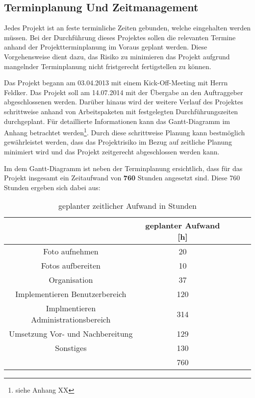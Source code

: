 \subsection{Terminplanung Und Zeitmanagement}
\label{sec:TerminplanungUndZeitManagement}

Jedes Projekt ist an feste terminliche Zeiten gebunden, welche eingehalten werden müssen. Bei der Durchführung dieses 
Projektes sollen die relevanten Termine anhand der Projektterminplanung im Voraus geplant werden. Diese Vorgehensweise 
dient dazu, das Risiko zu minimieren das Projekt aufgrund mangelnder Terminplanung nicht fristgerecht fertigstellen zu 
können.

Das Projekt begann am 03.04.2013 mit einem Kick-Off-Meeting mit Herrn Feldker. Das Projekt 
soll am 14.07.2014 mit der Übergabe an den Auftraggeber abgeschlossenen werden. Darüber hinaus wird 
der weitere Verlauf des Projektes schrittweise anhand von 
Arbeitspaketen mit festgelegten Durchführungszeiten durchgeplant. Für detaillierte Informationen kann das Gantt-Diagramm 
im Anhang betrachtet werden\footnote{siehe Anhang XX}.
Durch diese schrittweise Planung kann bestmöglich gewährleistet werden, dass das  Projektrisiko im Bezug auf zeitliche 
Planung minimiert wird und das Projekt zeitgerecht abgeschlossen werden kann.

Im dem Gantt-Diagramm ist neben der Terminplanung ersichtlich, dass für das Projekt insgesamt ein Zeitaufwand von
\textbf{760} Stunden angesetzt sind. Diese 760 Stunden ergeben sich dabei aus:

\begin{table}[h]
\centering
\begin{tabular}{ccccl}
\hline
\multicolumn{1}{l}{}                 & geplanter Aufwand {[}h{]}  \\ \hline
Foto aufnehmen                       & 20                         \\ \hline
Fotos aufbereiten                    & 10                         \\ \hline
Organisation                         & 37                         \\ \hline
Implementieren Benutzerbereich       & 120                        \\ \hline
Implmentieren Administrationsbereich & 314                        \\ \hline
Umsetzung Vor- und Nachbereitung     & 129                        \\ \hline
Sonstiges                            & 130                        \\ \hline
                                     & 760                        \\ \hline
\end{tabular}
\caption{geplanter zeitlicher Aufwand in Stunden}%
\label{tab:geplanterAufwand}%
\end{table}